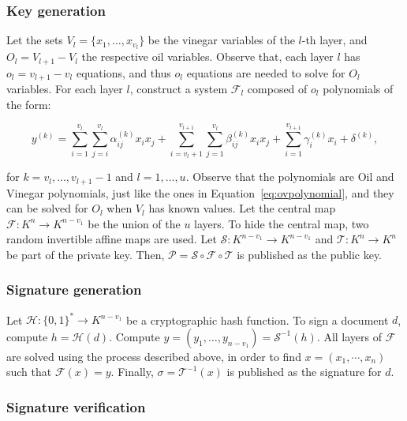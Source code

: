 \documentclass{ufsctex/ufsctex}
\begin{document}
\subsubsection{Key generation}

Let the sets $V_l = \{x_1, \dots, x_{v_l}\}$ be the vinegar variables of the
$l$-th layer, and $O_l = V_{l+1} - V_l$ the respective oil variables. Observe
that, each layer $l$ has $o_l = v_{l+1} - v_{l}$ equations, and thus $o_l$
equations are needed to solve for $O_l$ variables. For each layer $l$,
construct a system $\mathcal{F}_l$ composed of $o_l$ polynomials of the form:

\begin{equation}\label{eq:rainbowmap}
y^{(k)} =
\sum_{i=1}^{v_l}\sum_{j=i}^{v_l} \alpha^{(k)}_{ij} x_i x_j +
\sum_{i=v_l+1}^{v_{l+1}}\sum_{j=1}^{v_l} \beta^{(k)}_{ij} x_i x_j +
\sum_{i=1}^{v_{l+1}} \gamma^{(k)}_{i} x_i +
\delta^{(k)},
\end{equation}

\noindent
for $k = v_l, \dots, v_{l+1} - 1$ and $l = 1, \dots, u$. Observe that the
polynomials are Oil and Vinegar polynomials, just like the ones in
Equation~\ref{eq:ovpolynomial}, and they can be solved for $O_l$ when $V_l$ has
known values. Let the central map $\mathcal{F}:K^{n} \to K^{n-v_1}$ be the
union of the $u$ layers. To hide the central map, two random invertible affine
maps are used. Let $\mathcal{S}:K^{n-v_1} \to K^{n-v_1}$ and $\mathcal{T}:K^{n}
\to K^{n}$ be part of the private key. Then, $\mathcal{P} = \mathcal{S} \circ
\mathcal{F} \circ \mathcal{T}$ is published as the public key.

\subsubsection{Signature generation}

Let $\mathcal{H}: \{0,1\}^* \to K^{n-v_1}$ be a cryptographic hash function. To
sign a document $d$, compute $h = \mathcal{H}(d)$. Compute $y = (y_1, \dots,
y_{n-v_1}) = \mathcal{S}^{-1}(h)$. All layers of $\mathcal{F}$ are solved using
the process described above, in order to find $x = (x_1, \cdots, x_n)$ such
that $\mathcal{F}(x) = y$. Finally, $\sigma = \mathcal{T}^{-1}(x)$ is published
as the signature for $d$.

\subsubsection{Signature verification}
\end{document}
